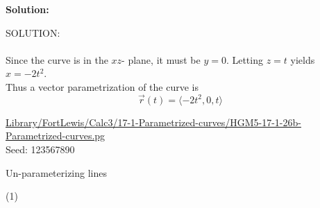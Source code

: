 \documentclass[10pt,]{book}
\theoremstyle{plain}
\theoremstyle{definition}
\theoremstyle{definition}
\theoremstyle{definition}
\theoremstyle{definition}
\theoremstyle{definition}
\numberwithin{equation}{section}
\begin{document}
\begin{exercisegroup}
\begin{mdframed}
{\par \par {\bf Solution: }\par  SOLUTION: \leavevmode\\\relax  \leavevmode\\\relax 
Since the curve is in the \(xz\)- plane, it must be \(y = 0\). 
Letting \(z = t\) yields \(x = -2t^{2}\).
\leavevmode\\\relax 
Thus a vector parametrization of the curve is 
\[\vec{r}(t) = \langle -2t^{2}, 0, t \rangle\]

\par 
}\par\vspace*{2ex}%
{\tiny\ttfamily\noindent\url{Library/FortLewis/Calc3/17-1-Parametrized-curves/HGM5-17-1-26b-Parametrized-curves.pg}\\Seed: 123567890\hfill}\end{mdframed}
\end{exercisegroup}
\par\smallskip\noindent
\hypertarget{exercisegroup-2}{}\par\noindent Un-parameterizing lines%
\begin{exercisegroup}(1)
\exercise[3.]\hypertarget{exercise-20}{}\mbox{}\\ %
\exercise[4.]\hypertarget{exercise-21}{}\mbox{}\\ %
\end{exercisegroup}
\end{document}
